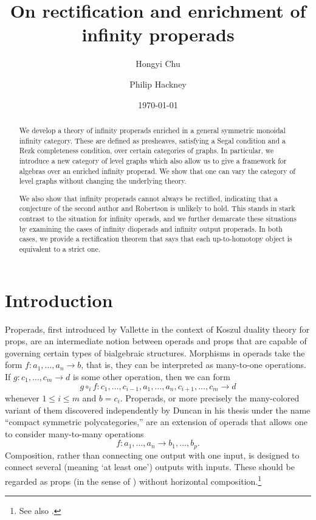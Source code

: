 \documentclass{amsart}
\title{On rectification and enrichment of infinity properads}
\author{Hongyi Chu}
\author{Philip Hackney}
\date{\today}
\numberwithin{theorem}{subsection}
\theoremstyle{definition}
\begin{document}
\begin{abstract}
We develop a theory of infinity properads enriched in a general symmetric monoidal infinity category.
These are defined as presheaves, satisfying a Segal condition and a Rezk completeness condition, over certain categories of graphs.
In particular, we introduce a new category of level graphs which also allow us to give a framework for algebras over an enriched infinity properad.
We show that one can vary the category of level graphs without changing the underlying theory.

We also show that infinity properads cannot always be rectified, indicating that a conjecture of the second author and Robertson is unlikely to hold.
This stands in stark contrast to the situation for infinity operads, and we further demarcate these situations by examining the cases of infinity dioperads and infinity output properads.
In both cases, we provide a rectification theorem that says that each up-to-homotopy object is equivalent to a strict one.
\end{abstract}

\maketitle

\tableofcontents

\section{Introduction}

Properads, first introduced by Vallette \cite{Vallette:KDP} in the context of Koszul duality theory for props, are an intermediate notion between operads and props that are capable of governing certain types of bialgebraic structures.
Morphisms in operads take the form $f \colon a_1, \dots, a_n \to b$, that is, they can be interpreted as many-to-one operations.
If $g \colon c_1, \dots, c_m \to d$ is some other operation, then we can form \[ g\circ_i f \colon c_1, \dots, c_{i-1}, a_1, \dots, a_n, c_{i+1}, \dots, c_m \to d\]  whenever $1\leq i \leq m$ and $b = c_i.$
Properads, or more precisely the many-colored variant of them discovered independently by Duncan in his thesis \cite[\S6.1]{Duncan:TQC} under the name ``compact symmetric polycategories,'' are an extension of operads that allows one to consider many-to-many operations \[f \colon a_1, \dots, a_n \to b_1, \dots, b_p.\]
Composition, rather than connecting one output with one input, is designed to connect several (meaning `at least one') outputs with inputs.
These should be regarded as props (in the sense of \cite[\S24]{MacLane:CA}) without horizontal composition.\footnote{See also \cite[p.80]{Duncan:TQC}.}
\end{document}
